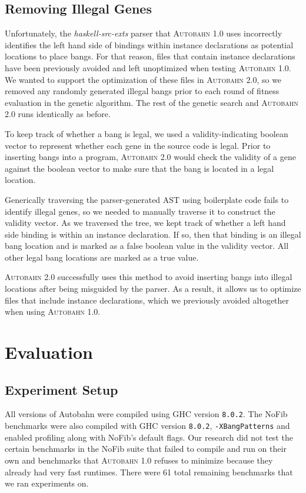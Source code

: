 \documentclass[format=sigplan, review=true]{acmart}
\newcommand{\Ao}[0]{\textsc{Autobahn 1.0}}
\newcommand{\At}[0]{\textsc{Autobahn 2.0}}
\begin{document}
\subsection{Removing Illegal Genes}

Unfortunately, the \textit{haskell-src-exts} parser that \Ao{} uses incorrectly identifies the left hand side of bindings within instance declarations as potential locations to place bangs. For that reason, files that contain instance declarations have been previously avoided and left unoptimized when testing \Ao{}. We wanted to support the optimization of these files in \At{}, so we removed any randomly generated illegal bangs prior to each round of fitness evaluation in the genetic algorithm. The rest of the genetic search and \At{} runs identically as before.

To keep track of whether a bang is legal, we used a validity-indicating boolean vector to represent whether each gene in the source code is legal. Prior to inserting bangs into a program, \At{} would check the validity of a gene against the boolean vector to make sure that the bang is located in a legal location.

Generically traversing the parser-generated AST using boilerplate code fails to identify illegal genes, so we needed to manually traverse it to construct the validity vector. As we traversed the tree, we kept track of whether a left hand side binding is within an instance declaration. If so, then that binding is an illegal bang location and is marked as a false boolean value in the validity vector. All other legal bang locations are marked as a true value.

\At{} successfully uses this method to avoid inserting bangs into illegal locations after being misguided by the parser. As a result, it allows us to optimize files that include instance declarations, which we previously avoided altogether when using \Ao{}. 

\section{Evaluation}

\subsection{Experiment Setup}

All versions of Autobahn were compiled using GHC version \texttt{8.0.2}. The NoFib benchmarks were also compiled with GHC version \texttt{8.0.2}, \texttt{-XBangPatterns} and enabled profiling along with NoFib's default flags. Our research did not test the certain benchmarks in the NoFib suite that failed to compile and run on their own and benchmarks that \Ao{} refuses to minimize because they already had very fast runtimes. There were 61 total remaining benchmarks that we ran experiments on.
\end{document}
